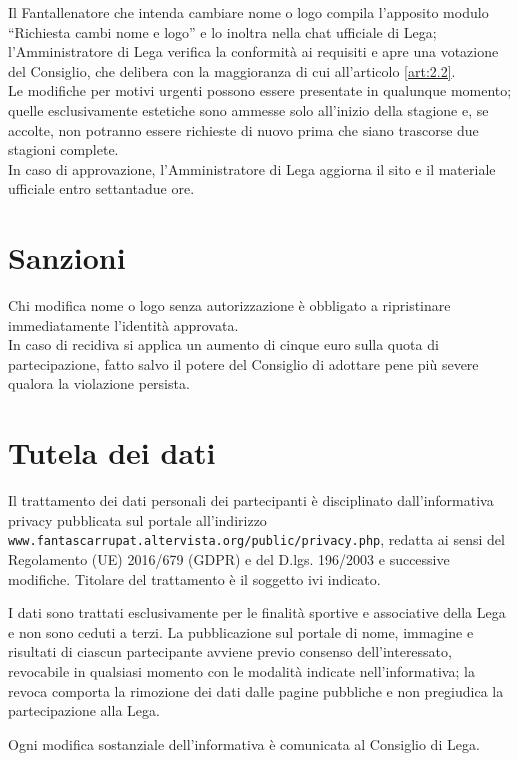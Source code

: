 Il Fantallenatore che intenda cambiare nome o logo compila l'apposito modulo “Richiesta cambi nome e logo” e lo inoltra nella chat ufficiale di Lega; l'Amministratore di Lega verifica la conformità ai requisiti e apre una votazione del Consiglio, che delibera con la maggioranza di cui all'articolo \ref{art:2.2}.\\
Le modifiche per motivi urgenti possono essere presentate in qualunque momento; quelle esclusivamente estetiche sono ammesse solo all'inizio della stagione e, se accolte, non potranno essere richieste di nuovo prima che siano trascorse due stagioni complete.\\
In caso di approvazione, l'Amministratore di Lega aggiorna il sito e il materiale ufficiale entro settantadue ore.

\section{Sanzioni}
\label{art:11.5}

Chi modifica nome o logo senza autorizzazione è obbligato a ripristinare immediatamente l'identità approvata.\\
In caso di recidiva si applica un aumento di cinque euro sulla quota di partecipazione, fatto salvo il potere del Consiglio di adottare pene più severe qualora la violazione persista.

\section{Tutela dei dati}
\label{art:11.6}

Il trattamento dei dati personali dei partecipanti è disciplinato dall'informativa privacy pubblicata sul portale all'indirizzo \texttt{www.fantascarrupat.altervista.org/public/privacy.php}, redatta ai sensi del Regolamento (UE) 2016/679 (GDPR) e del D.lgs. 196/2003 e successive modifiche. Titolare del trattamento è il soggetto ivi indicato.

I dati sono trattati esclusivamente per le finalità sportive e associative della Lega e non sono ceduti a terzi. La pubblicazione sul portale di nome, immagine e risultati di ciascun partecipante avviene previo consenso dell'interessato, revocabile in qualsiasi momento con le modalità indicate nell'informativa; la revoca comporta la rimozione dei dati dalle pagine pubbliche e non pregiudica la partecipazione alla Lega.

Ogni modifica sostanziale dell'informativa è comunicata al Consiglio di Lega.


